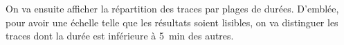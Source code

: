 \documentclass[11pt]{article}\usepackage[]{graphicx}\usepackage[]{color}
\begin{document}
\begin{center}
\end{center}

On va ensuite afficher la répartition des traces par plages de durées. D'emblée, pour avoir une échelle telle que les résultats soient lisibles, on va distinguer les traces dont la durée est inférieure à 5~min des autres.
\end{document}
